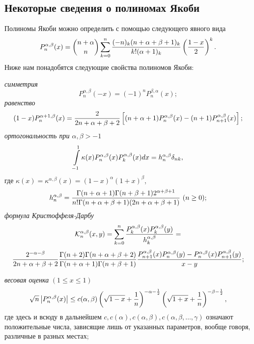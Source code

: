 \subsection{ Некоторые сведения о полиномах Якоби}


Полиномы Якоби можно определить \cite{Sego} с помощью следующего явного вида
\begin{equation}\label{Ykbeq.1.2.4.2.1}%
P_n^{\alpha,\beta}(x) ={n+\alpha\choose n}
\sum_{k=0}^n {(-n)_k(n+\alpha+\beta+1)_k\over k!(\alpha+1)_k}\left({1-x\over2}\right)^k.
\end{equation}
 Ниже нам понадобятся следующие свойства полиномов Якоби:

{\em симметрия}
$$
      P_n^{\alpha,\beta}(-x)=(-1)^nP_n^{\beta,\alpha}(x);
$$
{\em равенство}
 \begin{equation}\label{Ykbeq.1.2.4.2.2}%
(1-x)P_n^{\alpha+1,\beta}(x)={2\over2n+\alpha+\beta+2} \left[(n+
\alpha+1)P_n^{\alpha,\beta}(x)-
(n+1)P_{n+1}^{\alpha,\beta}(x)\right];
\end{equation}
{\em ортогональность при $\alpha,\beta>-1$}
\begin{equation}\label{Ykbeq.1.2.4.2.3}%
\int\limits\limits_{-1}^1\kappa(x)P_n^{\alpha,\beta}(x)
P_k^{\alpha,\beta}(x)dx
= h_n^{\alpha,\beta}\delta_{nk},
\end{equation}
где  $ \kappa(x)=\kappa^{\alpha,\beta}(x)=(1-x)^\alpha(1+x)^\beta$,
\begin{equation}\label{Ykbeq.1.2.4.2.4}%
 h_n^{\alpha,\beta} =
{\Gamma(n+\alpha+1)\Gamma(n+\beta+1)2^{\alpha+\beta+1} \over
n!\Gamma(n+\alpha+\beta+1)(2n+\alpha+\beta+1)}\,\,(n\ge0);
\end{equation}
{\em формула Кристоффеля-Дарбу }
$$\mathcal{K}_n^{\alpha,\beta}(x,y)=
\sum_{k=0}^n{P_k^{\alpha,\beta}(x)P_k^{\alpha,\beta}(y)\over
h_k^{\alpha,\beta}}=
$$
\begin{equation}\label{Ykbeq.1.2.4.2.5}%
 {2^{-\alpha-\beta}\over 2n+\alpha+\beta+2}
{\Gamma(n+2)\Gamma(n+\alpha+\beta+2)\over
\Gamma(n+\alpha+1)\Gamma(n+\beta+1)}
 {P_{n+1}^{\alpha,\beta}(x)P_n^{\alpha,\beta}(y)-
P_n^{\alpha,\beta}(x)P_{n+1}^{\alpha,\beta}(y)\over x-y};
\end{equation}


{\em весовая оценка} $(1\le x\le1)$
\begin{equation}\label{Ykbeq.1.2.4.2.6}%
\sqrt{n}\left| P_n^{\alpha,\beta}(x)\right|\le c(\alpha,\beta)
\left(\sqrt{1-x}+{1\over n}\right)^{-\alpha-{1\over2}}
\left(\sqrt{1+x}+{1\over n}\right)^{-\beta-{1\over2}},
\end{equation}
где здесь и всюду в дальнейшем $c,c(\alpha),c(\alpha,\beta),c(\alpha,\beta,\ldots,\gamma)$ означают
положительные числа, зависящие лишь от указанных параметров, вообще
говоря, различные в разных местах;

